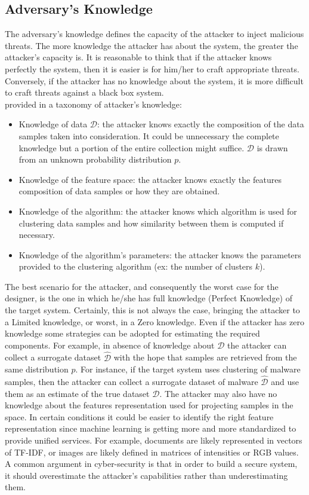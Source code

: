 \subsection{Adversary's Knowledge}
The adversary's knowledge defines the capacity of the attacker to inject malicious threats. The more knowledge the attacker has about the system, the greater the attacker's capacity is. It is reasonable to think that if the attacker knows perfectly the system, then it is easier is for him/her to craft appropriate threats. Conversely, if the attacker has no knowledge about the system, it is more difficult to craft threats against a black box system.\\
\citeauthor{isdataclustering} provided in \cite{isdataclustering} a taxonomy of attacker's knowledge:
\begin{itemize}
	\item Knowledge of data $\mathcal{D}$: the attacker knows exactly the composition of the data samples taken into consideration. It could be unnecessary the complete knowledge but a portion of the entire collection might suffice. $\mathcal{D}$ is drawn from an unknown probability distribution $p$.
	\item Knowledge of the feature space: the attacker knows exactly the features composition of data samples or how they are obtained. 
	\item Knowledge of the algorithm: the attacker knows which algorithm is used for clustering data samples and how similarity between them is computed if necessary.
	\item Knowledge of the algorithm's parameters: the attacker knows the parameters provided to the clustering algorithm (ex: the number of clusters $k$).
\end{itemize}
The best scenario for the attacker, and consequently the worst case for the designer, is the one in which he/she has full knowledge (Perfect Knowledge) of the target system. Certainly, this is not always the case, bringing the attacker to a Limited knowledge, or worst, in a Zero knowledge. Even if the attacker has zero knowledge some strategies can be adopted for estimating the required components. For example, in absence of knowledge about $\mathcal{D}$ the attacker can collect a surrogate dataset $\hat{\mathcal{D}}$ with the hope that samples are retrieved from the same distribution $p$. For instance, if the target system uses clustering of malware samples, then the attacker can collect a surrogate dataset of malware $\hat{\mathcal{D}}$ and use them as an estimate of the true dataset $\mathcal{D}$.
The attacker may also have no knowledge about the features representation used for projecting samples in the space. In certain conditions it could be easier to identify the right feature representation since machine learning is getting more and more standardized to provide unified services. For example, documents are likely represented in vectors of TF-IDF, or images are likely defined in matrices of intensities or RGB values. \\
A common argument in cyber-security is that in order to build a secure system, it should overestimate the attacker's capabilities rather than underestimating them.


